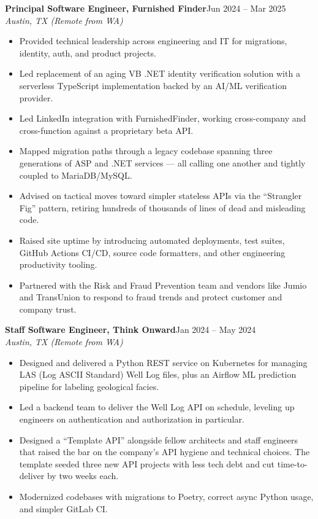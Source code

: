 \documentclass[11pt,letterpaper]{article}
\newcommand{\role}[4]{%
  \vspace{0.4em}%
  \noindent\textbf{#1, #2}\hfill{#4}\\
  \textit{#3}\par\vspace{0.05em}%
}
\begin{document}
\role{Principal Software Engineer}{Furnished Finder}{Austin, TX (Remote from WA)}{Jun 2024 -- Mar 2025}
\begin{itemize}
  \item Provided technical leadership across engineering and IT for migrations, identity, auth, and product projects.
  \item Led replacement of an aging VB .NET identity verification solution with a serverless TypeScript implementation backed by an AI/ML verification provider.
  \item Led LinkedIn integration with FurnishedFinder, working cross-company and cross-function against a proprietary beta API.
  \item Mapped migration paths through a legacy codebase spanning three generations of ASP and .NET services --- all calling one another and tightly coupled to MariaDB/MySQL.
  \item Advised on tactical moves toward simpler stateless APIs via the ``Strangler Fig'' pattern, retiring hundreds of thousands of lines of dead and misleading code.
  \item Raised site uptime by introducing automated deployments, test suites, GitHub Actions CI/CD, source code formatters, and other engineering productivity tooling.
  \item Partnered with the Risk and Fraud Prevention team and vendors like Jumio and TransUnion to respond to fraud trends and protect customer and company trust.
\end{itemize}

\role{Staff Software Engineer}{Think Onward}{Austin, TX (Remote from WA)}{Jan 2024 -- May 2024}
\begin{itemize}
  \item Designed and delivered a Python REST service on Kubernetes for managing LAS (Log ASCII Standard) Well Log files, plus an Airflow ML prediction pipeline for labeling geological facies.
  \item Led a backend team to deliver the Well Log API on schedule, leveling up engineers on authentication and authorization in particular.
  \item Designed a ``Template API'' alongside fellow architects and staff engineers that raised the bar on the company's API hygiene and technical choices. The template seeded three new API projects with less tech debt and cut time-to-deliver by two weeks each.
  \item Modernized codebases with migrations to Poetry, correct async Python usage, and simpler GitLab CI.
\end{itemize}
\end{document}
